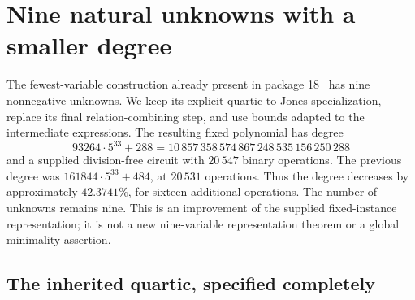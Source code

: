 \section{Nine natural unknowns with a smaller degree}
\label{sec:nine-improved}

The fewest-variable construction already present in package 18~\cite{p18} has nine
nonnegative unknowns. We keep its explicit quartic-to-Jones specialization,
replace its final relation-combining step, and use bounds adapted to the
intermediate expressions. The resulting fixed polynomial has degree
\[
 \boxed{93264\cdot5^{33}+288
 =10\,857\,358\,574\,867\,248\,535\,156\,250\,288}
\]
and a supplied division-free circuit with $20\,547$ binary operations.
The previous degree was $161844\cdot5^{33}+484$, at $20\,531$ operations.
Thus the degree decreases by approximately $42.3741\%$, for sixteen
additional operations. The number of unknowns remains nine. This is an
improvement of the supplied fixed-instance representation; it is not a new
nine-variable representation theorem or a global minimality assertion.

\subsection{The inherited quartic, specified completely}


